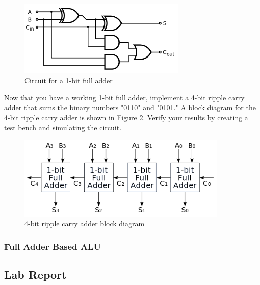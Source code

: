 \begin{figure}[H]
	\centering
	\includegraphics[width=80mm]{Lab3/figures/fulladder.png}
	\caption{Circuit for a 1-bit full adder}
	\label{fig:fulladder}
\end{figure}

Now that you have a working 1-bit full adder, implement a 4-bit ripple carry adder that sums the binary numbers "0110" and "0101." A block diagram for the 4-bit ripple carry adder is shown in Figure \ref{fig:fourbitripple}. Verify your results by creating a test bench and simulating the circuit.

\begin{figure}[H]
	\centering
	\includegraphics[width=100mm]{Lab3/figures/fourbitripple.png}
	\caption{4-bit ripple carry adder block diagram}
	\label{fig:fourbitripple}
\end{figure}

\subsubsection{Full Adder Based ALU}


\subsection{Lab Report}









